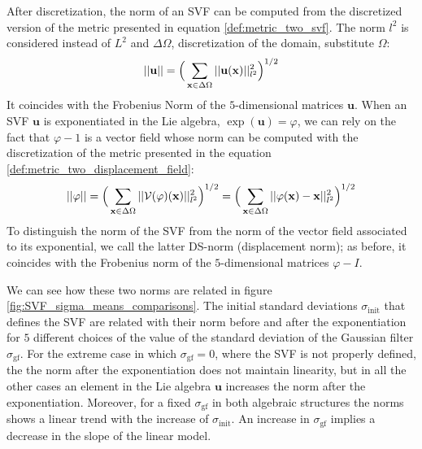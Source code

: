 After discretization, the norm of an SVF can be computed from the discretized version of the metric presented in equation \ref{def:metric_two_svf}. The norm $l^2$ is considered instead of $L^2$ and $\Delta\Omega$, discretization of the domain, substitute $\Omega$:
\begin{align*}
\vert\lvert \mathbf{u} \rvert\vert  
= 
\Big( \sum_{\mathbf{x} \in \Delta\Omega} \vert\lvert \mathbf{u}(\mathbf{x})  \rvert\vert_{l^2}^{2}  \Big)^{1/2}
\end{align*} 
It coincides with the Frobenius Norm of the $5$-dimensional matrices $\mathbf{u}$.
When an SVF $\mathbf{u}$ is exponentiated in the Lie algebra, $\exp(\mathbf{u}) = \varphi$, we can rely on the fact that $\varphi - 1$ is a vector field whose norm can be computed with the discretization of the metric presented in the equation \ref{def:metric_two_displacement_field}:
\begin{align*}
\vert\lvert \varphi \rvert\vert  
= 
\Big( \sum_{\mathbf{x} \in \Delta\Omega} \vert\lvert \mathcal{V}(\varphi)(\mathbf{x})  \rvert\vert_{l^2}^{2}  \Big)^{1/2}
=
\Big( \sum_{\mathbf{x} \in \Delta\Omega} \vert\lvert \varphi(\mathbf{x}) - \mathbf{x}  \rvert\vert_{l^2}^{2}  \Big)^{1/2}
\end{align*} 
To distinguish the norm of the SVF from the norm of the vector field associated to its exponential, we call the latter DS-norm (displacement norm); as before, it coincides with the Frobenius norm of the $5$-dimensional matrices $\varphi - I$.

We can see how these two norms are related in figure \ref{fig:SVF_sigma_means_comparisons}. The initial standard deviations $\sigma_{\text{init}}$ that defines the SVF are related with their norm before and after the exponentiation for $5$ different choices of the value of the standard deviation of the Gaussian filter $\sigma_{\text{gf}}$.
For the extreme case in which $\sigma_{\text{gf}} = 0$, where the SVF is not properly defined, the the norm after the exponentiation does not maintain linearity, but in all the other cases an element in the Lie algebra $\mathbf{u}$ increases the norm after the exponentiation. Moreover, for a fixed $\sigma_{\text{gf}} $ in both algebraic structures the norms shows a linear trend with the increase of $\sigma_{\text{init}}$. An increase in $\sigma_{\text{gf}} $ implies a decrease in the slope of the linear model.

